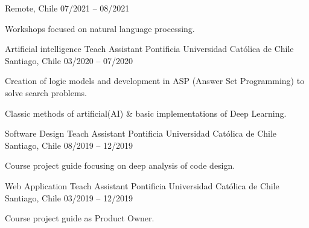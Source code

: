 \begin{cventries}
  {Remote, Chile} %
  {07/2021 – 08/2021} %
  {
    \begin{cvitems} %
      \item {Workshops focused on natural language processing.}
    \end{cvitems}
  }
  \newline
  \cventry
  {Artificial intelligence Teach Assistant} %
  {Pontificia Universidad Católica de Chile} %
  {Santiago, Chile} %
  {03/2020 – 07/2020} %
  {
    \begin{cvitems} %
      \item {Creation of logic models and development in ASP (Answer Set Programming) to solve search problems.}
      \item {Classic methods of artificial(AI) \& basic implementations of Deep Learning.}
    \end{cvitems}
  }
  \newline

  \cventry
  {Software Design Teach Assistant} %
  {Pontificia Universidad Católica de Chile} %
  {Santiago, Chile} %
  {08/2019 – 12/2019} %
  {
    \begin{cvitems} %
      \item {Course project guide focusing on deep analysis of code design. }
    \end{cvitems}
  }
  \newline

  \cventry
  {Web Application Teach Assistant} %
  {Pontificia Universidad Católica de Chile} %
  {Santiago, Chile} %
  {03/2019 – 12/2019} %
  {
    \begin{cvitems} %
      \item {Course project guide as Product Owner.}
    \end{cvitems}
  }
  \newline
\end{cventries}
